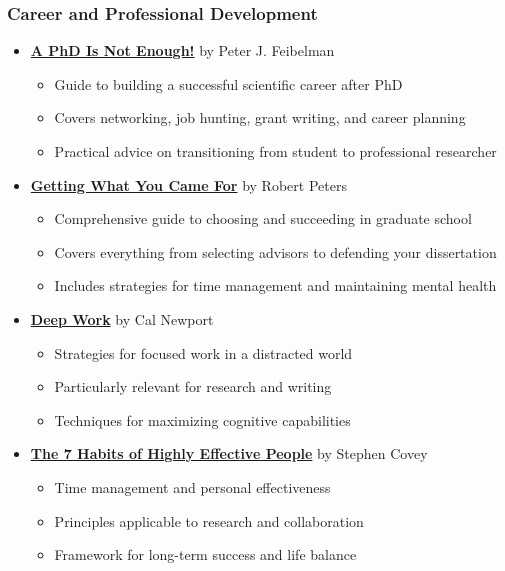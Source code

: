 \documentclass[11pt,a4paper]{article}
\begin{document}
\subsubsection{Career and Professional Development}

\begin{itemize}
    \item \textbf{\href{https://www.amazon.com/PhD-Not-Enough-Survival-Science/dp/0465022227}{A PhD Is Not Enough!}} by Peter J. Feibelman
    \begin{itemize}
        \item Guide to building a successful scientific career after PhD
        \item Covers networking, job hunting, grant writing, and career planning
        \item Practical advice on transitioning from student to professional researcher
    \end{itemize}
    
    \item \textbf{\href{https://www.amazon.com/Getting-What-You-Came-For/dp/0374524777}{Getting What You Came For}} by Robert Peters
    \begin{itemize}
        \item Comprehensive guide to choosing and succeeding in graduate school
        \item Covers everything from selecting advisors to defending your dissertation
        \item Includes strategies for time management and maintaining mental health
    \end{itemize}
    
    \item \textbf{\href{https://www.amazon.com/Deep-Work-Focused-Success-Distracted/dp/1455586692}{Deep Work}} by Cal Newport
    \begin{itemize}
        \item Strategies for focused work in a distracted world
        \item Particularly relevant for research and writing
        \item Techniques for maximizing cognitive capabilities
    \end{itemize}
    
    \item \textbf{\href{https://www.amazon.com/Habits-Highly-Effective-People-Powerful/dp/1982137274}{The 7 Habits of Highly Effective People}} by Stephen Covey
    \begin{itemize}
        \item Time management and personal effectiveness
        \item Principles applicable to research and collaboration
        \item Framework for long-term success and life balance
    \end{itemize}
\end{itemize}
\end{document}
